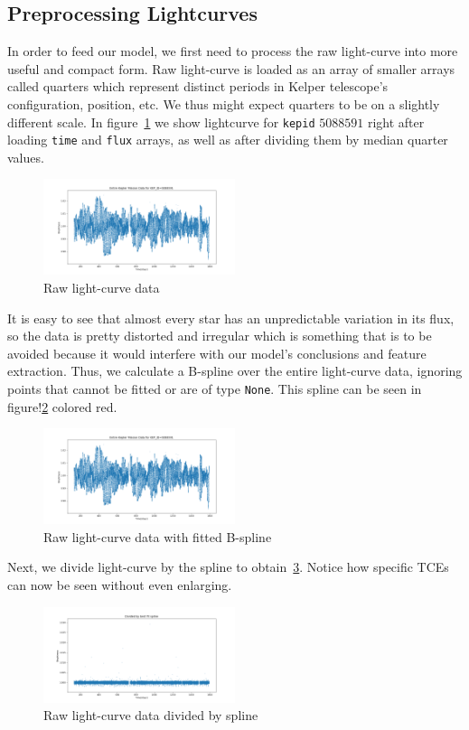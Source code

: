 \documentclass[twoside]{article}
\newcommand{\code}[1]{\texttt{#1}}
\begin{document}
\begin{multicols}{2}
\subsection{Preprocessing Lightcurves}
In order to feed our model, we first need to process the raw light-curve into more useful and compact form. Raw light-curve is loaded as an array of smaller arrays called quarters which represent distinct periods in Kelper telescope's configuration, position, etc. We thus might expect quarters to be on a slightly different scale. In figure~\ref{fig:raw_lc} we show lightcurve for \code{kepid} $5088591$ right after loading \code{time} and \code{flux} arrays, as well as after dividing them by median quarter values.  
\begin{figure}[H]
\includegraphics[width=0.5\textwidth]{raw_lc}
\caption{Raw light-curve data}
\label{fig:raw_lc}
\end{figure}

It is easy to see that almost every star has an unpredictable variation in its flux, so the data is pretty distorted and irregular which is something that is to be avoided because it would interfere with our model's conclusions and feature extraction. Thus, we calculate a B-spline over the entire light-curve data, ignoring points that cannot be fitted or are of type \code{None}. This spline can be seen in figure!\ref{fig:raw_spline_lc} colored red.
\begin{figure}[H]
\includegraphics[width=0.5\textwidth]{raw_lc}
\caption{Raw light-curve data with fitted B-spline}
\label{fig:raw_spline_lc}
\end{figure}

Next, we divide light-curve by the spline to obtain~\ref{fig:divided_lc}. Notice how specific TCEs can now be seen without even enlarging. 
\begin{figure}[H]
\includegraphics[width=0.5\textwidth]{divided_lc}
\caption{Raw light-curve data divided by spline}
\label{fig:divided_lc}
\end{figure}


\end{multicols}
\end{document}
